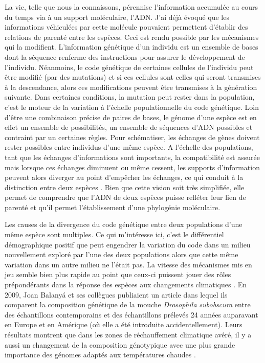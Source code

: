La vie, telle que nous la connaissons, pérennise l'information accumulée
au cours du temps via à un support moléculaire, l'ADN. J'ai déjà évoqué
que les informations véhiculées par cette molécule pouvaient permettent
d'établir des relations de parenté entre les espèces. Ceci est rendu
possible par les mécanismes qui la modifient. L'information génétique
d'un individu est un ensemble de bases dont la séquence renferme des
instructions pour assurer le développement de l'individu. Néanmoins, le
code génétique de certaines cellules de l'individu peut être modifié
(par des mutations) et si ces cellules sont celles qui seront transmises
à la descendance, alors ces modifications peuvent être transmises à la
génération suivante. Dans certaines conditions, la mutation peut rester
dans la population, c'est le moteur de la variation à l'échelle
populationnelle du code génétique. Loin d'être une combinaison précise
de paires de bases, le génome d'une espèce est en effet un ensemble de
possibilités, un ensemble de séquences d'ADN possibles et contraint par
un certaines règles. Pour schématiser, les échanges de gènes doivent
rester possibles entre individus d'une même espèce. A l'échelle des
populations, tant que les échanges d'informations sont importants, la
compatibilité est assurée mais lorsque ces échanges diminuent ou même
cessent, les supports d'information peuvent alors diverger au point
d'empêcher les échanges, ce qui conduit à la distinction entre deux
espèces \citep{Coyne2004}. Bien que cette vision soit très simplifiée,
elle permet de comprendre que l'ADN de deux espèces puisse refléter leur
lien de parenté et qu'il permet l'établissement d'une phylogénie
moléculaire.

Les causes de la divergence du code génétique entre deux populations
d'une même espèce sont multiples. Ce qui m'intéresse ici, c'est le
différentiel démographique positif que peut engendrer la variation du
code dans un milieu nouvellement exploré par l'une des deux populations
alors que cette même variation dans un autre milieu ne l'était pas. La
vitesse des mécanismes mis en jeu semble bien plus rapide au point que
ceux-ci puissent jouer des rôles prépondérants dans la réponse des
espèces aux changements climatiques \citep{Lavergne2010}. En 2009, Joan
Balanyá et ses collègues publiaient un article dans lequel ils comparent
la composition génétique de la mouche \emph{Drosophila subobscura} entre
des échantillons contemporains et des échantillons prélevés 24 années
auparavant en Europe et en Amérique (où elle a été introduite
accidentellement). Leurs résultats montrent que dans les zones de
réchauffement climatique avéré, il y a aussi un changement de la
composition génotypique avec une plus grande importance des génomes
adaptés aux températures chaudes \citep{Balanya2006}.

